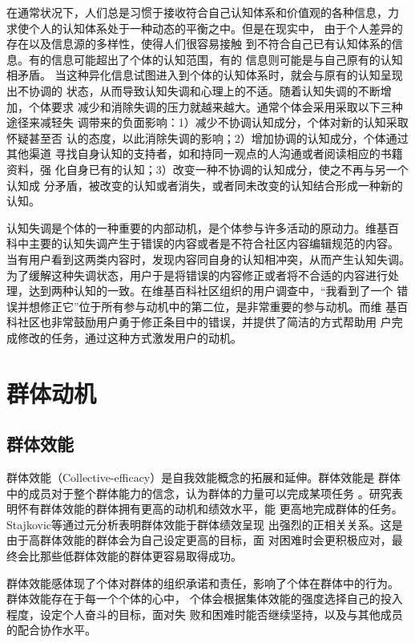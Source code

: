 在通常状况下，人们总是习惯于接收符合自己认知体系和价值观的各种信息，力
求使个人的认知体系处于一种动态的平衡之中。但是在现实中，
由于个人差异的存在以及信息源的多样性，使得人们很容易接触
到不符合自己已有认知体系的信息。有的信息可能超出了个体的认知范围，有的
信息则可能是与自己原有的认知相矛盾。
当这种异化信息试图进入到个体的认知体系时，就会与原有的认知呈现出不协调的
状态，从而导致认知失调和心理上的不适。随着认知失调的不断增加，个体要求
减少和消除失调的压力就越来越大。通常个体会采用采取以下三种途径来减轻失
调带来的负面影响：1）减少不协调认知成分，个体对新的认知采取怀疑甚至否
认的态度，以此消除失调的影响；2）增加协调的认知成分，个体通过其他渠道
寻找自身认知的支持者，如和持同一观点的人沟通或者阅读相应的书籍资料，强
化自身已有的认知；3）改变一种不协调的认知成分，使之不再与另一个认知成
分矛盾，被改变的认知或者消失，或者同未改变的认知结合形成一种新的认知。 

认知失调是个体的一种重要的内部动机，是个体参与许多活动的原动力。维基百
科中主要的认知失调产生于错误的内容或者是不符合社区内容编辑规范的内容。
当有用户看到这两类内容时，发现内容同自身的认知相冲突，从而产生认知失调。
为了缓解这种失调状态，用户于是将错误的内容修正或者将不合适的内容进行处
理，达到两种认知的一致。在维基百科社区组织的用户调查中，“我看到了一个
错误并想修正它”位于所有参与动机中的第二位，是非常重要的参与动机。而维
基百科社区也非常鼓励用户勇于修正条目中的错误，并提供了简洁的方式帮助用
户完成修改的任务，通过这种方式激发用户的动机。
\section{群体动机}
\label{sec:groupe-motivation}

\subsection{群体效能}
\label{sec:collective-efficacy}

群体效能（Collective-efficacy）是自我效能概念的拓展和延伸。群体效能是
群体中的成员对于整个群体能力的信念，认为群体的力量可以完成某项任务
\cite{bundura}。研究表明怀有群体效能的群体拥有更高的动机和绩效水平，能
更高地完成群体的任务。Stajkovic等通过元分析表明群体效能于群体绩效呈现
出强烈的正相关关系。这是由于高群体效能的群体会为自己设定更高的目标，面
对困难时会更积极应对，最终会比那些低群体效能的群体更容易取得成功。

群体效能感体现了个体对群体的组织承诺和责任，影响了个体在群体中的行为。
群体效能存在于每一个个体的心中，
个体会根据集体效能的强度选择自己的投入程度，设定个人奋斗的目标，面对失
败和困难时能否继续坚持，以及与其他成员的配合协作水平。

